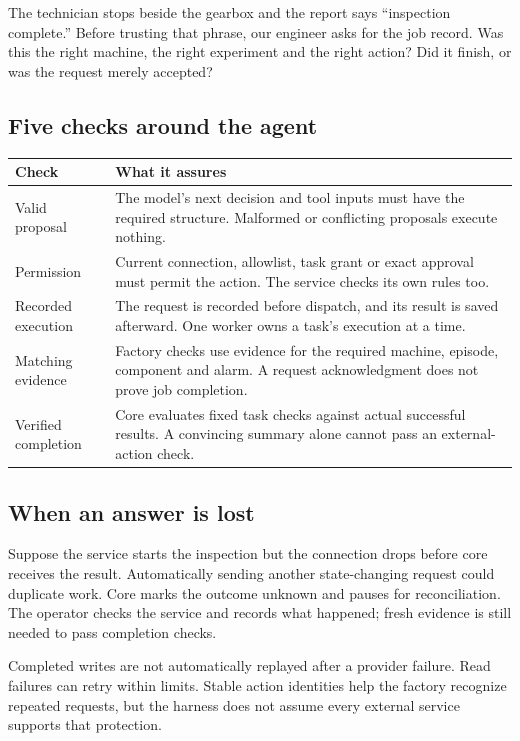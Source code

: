 The technician stops beside the gearbox and the report says ``inspection complete.'' Before trusting that phrase, our engineer asks for the job record. Was this the right machine, the right experiment and the right action? Did it finish, or was the request merely accepted?

\subsection*{Five checks around the agent}
\begin{tabularx}{\linewidth}{@{}p{.29\linewidth}X@{}}\toprule
Check & What it assures\\\midrule
Valid proposal & The model's next decision and tool inputs must have the required structure. Malformed or conflicting proposals execute nothing.\\
Permission & Current connection, allowlist, task grant or exact approval must permit the action. The service checks its own rules too.\\
Recorded execution & The request is recorded before dispatch, and its result is saved afterward. One worker owns a task's execution at a time.\\
Matching evidence & Factory checks use evidence for the required machine, episode, component and alarm. A request acknowledgment does not prove job completion.\\
Verified completion & Core evaluates fixed task checks against actual successful results. A convincing summary alone cannot pass an external-action check.\\\bottomrule
\end{tabularx}

\subsection*{When an answer is lost}
Suppose the service starts the inspection but the connection drops before core receives the result. Automatically sending another state-changing request could duplicate work. Core marks the outcome unknown and pauses for reconciliation. The operator checks the service and records what happened; fresh evidence is still needed to pass completion checks.

Completed writes are not automatically replayed after a provider failure. Read failures can retry within limits. Stable action identities help the factory recognize repeated requests, but the harness does not assume every external service supports that protection.

